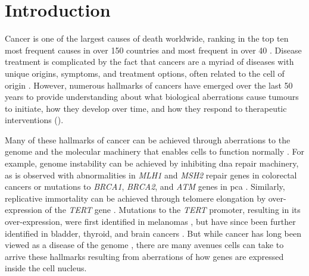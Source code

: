 \chapter{Introduction}
\label{chap:intro}

Cancer is one of the largest causes of death worldwide, ranking in the top ten most frequent causes in over 150 countries and most frequent in over 40 \cite{brayGlobalCancerStatistics2018}.
Disease treatment is complicated by the fact that cancers are a myriad of diseases with unique origins, symptoms, and treatment options, often related to the cell of origin \cite{gilbertsonMappingCancerOrigins2011}.
However, numerous hallmarks of cancers have emerged over the last 50 years to provide understanding about what biological aberrations cause tumours to initiate, how they develop over time, and how they respond to therapeutic interventions \cite{hanahanHallmarksCancer2000,hanahanHallmarksCancerNext2011,flavahanEpigeneticPlasticityHallmarks2017,pavlovaEmergingHallmarksCancer2016} ().


Many of these hallmarks of cancer can be achieved through aberrations to the genome and the molecular machinery that enables cells to function normally \cite{garrawayLessonsCancerGenome2013}.
For example, genome instability can be achieved by inhibiting \gls{dna} repair machinery, as is observed with abnormalities in \emph{MLH1} and \emph{MSH2} repair genes in colorectal cancers \cite{lengauerGeneticInstabilitiesHuman1998} or mutations to \emph{BRCA1}, \emph{BRCA2}, and \emph{ATM} genes in \gls{pca} \cite{abeshouseMolecularTaxonomyPrimary2015}.
Similarly, replicative immortality can be achieved through telomere elongation by over-expression of the \emph{TERT} gene \cite{vinagreFrequencyTERTPromoter2013}.
Mutations to the \emph{TERT} promoter, resulting in its over-expression, were first identified in melanomas \cite{huangHighlyRecurrentTERT2013,hornTERTPromoterMutations2013}, but have since been further identified in bladder, thyroid, and brain cancers \cite{vinagreFrequencyTERTPromoter2013,nagarajanRecurrentEpimutationsActivate2014,sternMutationTERTPromoter2015}.
But while cancer has long been viewed as a disease of the genome \cite{hanahanHallmarksCancer2000,garrawayLessonsCancerGenome2013}, there are many avenues cells can take to arrive these hallmarks resulting from aberrations of how genes are expressed inside the cell nucleus.

